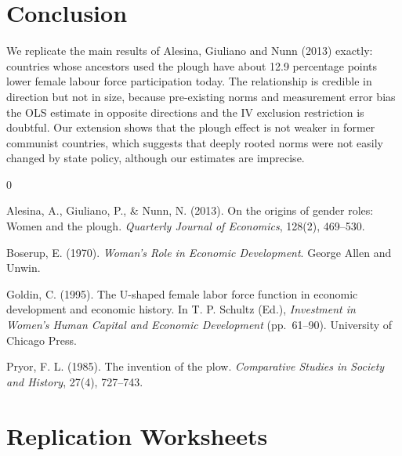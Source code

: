 \documentclass[12pt,a4paper]{article}
\begin{document}
\section{Conclusion}
We replicate the main results of Alesina, Giuliano and Nunn (2013) exactly: countries whose ancestors used the plough have about 12.9 percentage points lower female labour force participation today. The relationship is credible in direction but not in size, because pre-existing norms and measurement error bias the OLS estimate in opposite directions and the IV exclusion restriction is doubtful. Our extension shows that the plough effect is not weaker in former communist countries, which suggests that deeply rooted norms were not easily changed by state policy, although our estimates are imprecise.

\begin{thebibliography}{0}
\makeatletter\renewcommand\@biblabel[1]{}\makeatother
\setlength{\leftskip}{1.5em}\setlength{\itemindent}{-1.5em}

 Alesina, A., Giuliano, P., \& Nunn, N. (2013). On the origins of gender roles: Women and the plough. \textit{Quarterly Journal of Economics}, 128(2), 469--530.

 Boserup, E. (1970). \textit{Woman's Role in Economic Development}. George Allen and Unwin.

 Goldin, C. (1995). The U-shaped female labor force function in economic development and economic history. In T. P. Schultz (Ed.), \textit{Investment in Women's Human Capital and Economic Development} (pp.~61--90). University of Chicago Press.

 Pryor, F. L. (1985). The invention of the plow. \textit{Comparative Studies in Society and History}, 27(4), 727--743.
\end{thebibliography}

\clearpage
\appendix
\section{Replication Worksheets}
\end{document}
